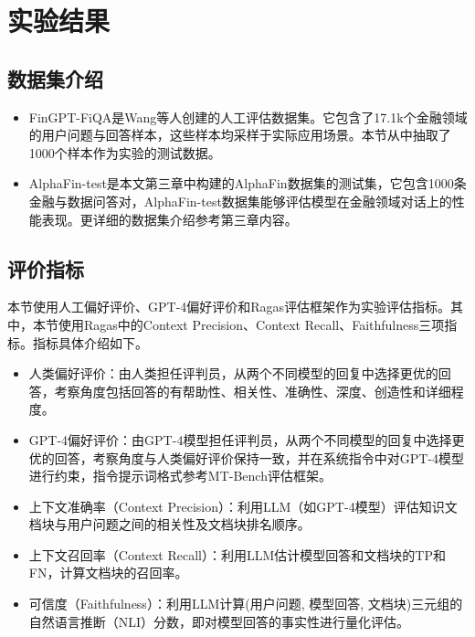\section{实验结果}

\subsection{数据集介绍}

\begin{itemize}[topsep = 0 pt, itemsep= 0 pt, parsep=0pt, partopsep=0pt, leftmargin=36pt, itemindent=0pt, labelsep=6pt, listparindent=24pt]
	\item FinGPT-FiQA\cite{wang2023fingptbenchmark}是Wang等人创建的人工评估数据集。它包含了17.1k个金融领域的用户问题与回答样本，这些样本均采样于实际应用场景。本节从中抽取了1000个样本作为实验的测试数据。
	\item AlphaFin-test是本文第三章中构建的AlphaFin数据集的测试集，它包含1000条金融与数据问答对，AlphaFin-test数据集能够评估模型在金融领域对话上的性能表现。更详细的数据集介绍参考第三章内容。
\end{itemize}

\subsection{评价指标}

本节使用人工偏好评价、GPT-4偏好评价和Ragas\cite{DBLP:conf/eacl/ESJAS24}评估框架作为实验评估指标。其中，本节使用Ragas中的Context Precision、Context Recall、Faithfulness三项指标。指标具体介绍如下。

\begin{itemize}[topsep = 0 pt, itemsep= 0 pt, parsep=0pt, partopsep=0pt, leftmargin=36pt, itemindent=0pt, labelsep=6pt, listparindent=24pt]
	\item 人类偏好评价：由人类担任评判员，从两个不同模型的回复中选择更优的回答，考察角度包括回答的有帮助性、相关性、准确性、深度、创造性和详细程度。
	\item GPT-4偏好评价：由GPT-4\cite{DBLP:journals/corr/abs-2303-08774}模型担任评判员，从两个不同模型的回复中选择更优的回答，考察角度与人类偏好评价保持一致，并在系统指令中对GPT-4模型进行约束，指令提示词格式参考MT-Bench\cite{zheng2023judging}评估框架。
	\item 上下文准确率（Context Precision）：利用LLM（如GPT-4模型）评估知识文档块与用户问题之间的相关性及文档块排名顺序。
	\item 上下文召回率（Context Recall）：利用LLM估计模型回答和文档块的TP和FN，计算文档块的召回率。
	\item 可信度（Faithfulness）：利用LLM计算(用户问题, 模型回答, 文档块)三元组的自然语言推断（NLI）分数，即对模型回答的事实性进行量化评估。
\end{itemize}

